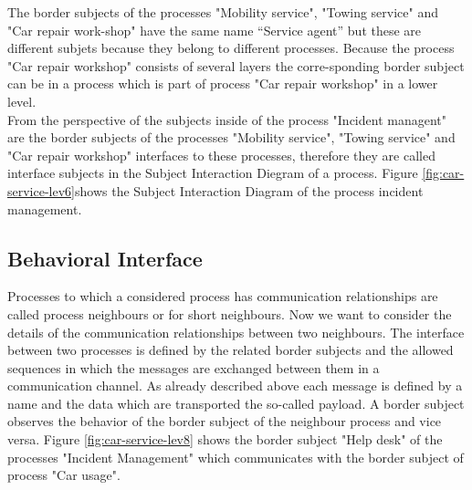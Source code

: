 The border subjects of the processes "Mobility service", "Towing service" and "Car repair work-shop" have the same name “Service agent” but these are different subjets because they belong to different processes. Because the process "Car repair workshop" consists of several layers the corre-sponding border subject can be in a process which is part of process "Car repair workshop" in a lower level.\\
From the perspective of the subjects inside of the process "Incident managent" are the border subjects of the processes "Mobility service", "Towing service" and "Car repair workshop" interfaces to these processes, therefore they are called interface subjects in the Subject Interaction Diegram of a process. Figure \ref{fig:car-service-lev6}shows the Subject Interaction Diagram of the process incident management.\\


\subsection{Behavioral Interface}
Processes to which a considered process has communication relationships are called process neighbours or for short neighbours. Now we want to consider the details of the communication relationships between two neighbours. The interface between two processes is defined by the related border subjects and the allowed sequences in which the messages are exchanged between them in a communication channel. As already described above each message is defined by a name and the data which are transported the so-called payload. A border subject observes the behavior of the border subject of the neighbour process and vice versa. Figure \ref{fig:car-service-lev8} shows the border subject "Help desk" of the processes "Incident Management" which communicates with the border subject of process "Car usage".\\

